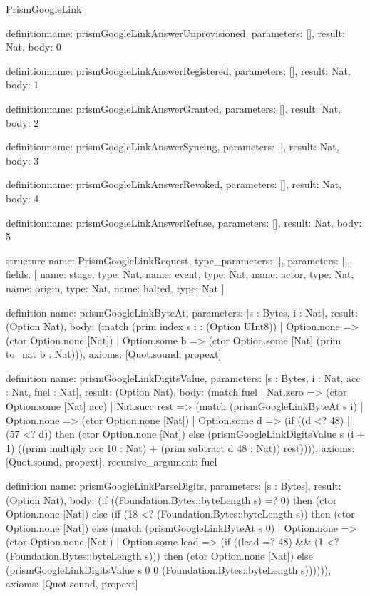 \begin{lexlean}{PrismGoogleLink}
\begin{semanticmodule}
definition{name: prismGoogleLinkAnswerUnprovisioned, parameters: [], result: Nat, body: 0}

definition{name: prismGoogleLinkAnswerRegistered, parameters: [], result: Nat, body: 1}

definition{name: prismGoogleLinkAnswerGranted, parameters: [], result: Nat, body: 2}

definition{name: prismGoogleLinkAnswerSyncing, parameters: [], result: Nat, body: 3}

definition{name: prismGoogleLinkAnswerRevoked, parameters: [], result: Nat, body: 4}

definition{name: prismGoogleLinkAnswerRefuse, parameters: [], result: Nat, body: 5}

structure{
  name: PrismGoogleLinkRequest,
  type_parameters: [],
  parameters: [],
  fields: [
    {name: stage, type: Nat},
    {name: event, type: Nat},
    {name: actor, type: Nat},
    {name: origin, type: Nat},
    {name: halted, type: Nat}
  ]
}

definition{
  name: prismGoogleLinkByteAt,
  parameters: [s : Bytes, i : Nat],
  result: (Option Nat),
  body: (match (prim index s i : (Option UInt8))
    | Option.none => (ctor Option.none [Nat])
    | Option.some b => (ctor Option.some [Nat] (prim to_nat b : Nat))),
  axioms: [Quot.sound, propext]
}

definition{
  name: prismGoogleLinkDigitsValue,
  parameters: [s : Bytes, i : Nat, acc : Nat, fuel : Nat],
  result: (Option Nat),
  body: (match fuel
    | Nat.zero => (ctor Option.some [Nat] acc)
    | Nat.succ rest => (match (prismGoogleLinkByteAt s i)
      | Option.none => (ctor Option.none [Nat])
      | Option.some d => (if ((d <? 48) || (57 <? d)) then (ctor Option.none [Nat]) else (prismGoogleLinkDigitsValue s (i + 1) ((prim multiply acc 10 : Nat) + (prim subtract d 48 : Nat)) rest)))),
  axioms: [Quot.sound, propext],
  recursive_argument: fuel
}

definition{
  name: prismGoogleLinkParseDigits,
  parameters: [s : Bytes],
  result: (Option Nat),
  body: (if ((Foundation.Bytes::byteLength s) =? 0) then (ctor Option.none [Nat]) else (if (18 <? (Foundation.Bytes::byteLength s)) then (ctor Option.none [Nat]) else (match (prismGoogleLinkByteAt s 0)
    | Option.none => (ctor Option.none [Nat])
    | Option.some lead => (if ((lead =? 48) && (1 <? (Foundation.Bytes::byteLength s))) then (ctor Option.none [Nat]) else (prismGoogleLinkDigitsValue s 0 0 (Foundation.Bytes::byteLength s)))))),
  axioms: [Quot.sound, propext]
}


\end{semanticmodule}
\end{lexlean}
